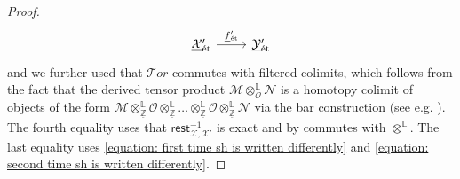\documentclass[11pt]{amsart}
\theoremstyle{definition}
\theoremstyle{definition}
\newtheorem{lemma}[theorem]{Lemma}
\newcommand{\cM}{\mathcal{M}}
\newcommand{\cN}{\mathcal{N}}
\newcommand{\cO}{\mathcal{O}}
\newcommand{\cT}{\mathcal{T}}
\newcommand{\cX}{\mathcal{X}}
\newcommand{\cY}{\mathcal{Y}}
\newcommand{\ul}[1]{\underline{#1}}
\newcommand{\cal}{\mathcal}
\def\cM{{\cal M}}
\def\cN{{\cal N}}
\def\cO{{\cal O}}
\def\cT{{\cal T}}
\def\cX{{\cal X}}
\def\cY{{\cal Y}}
\begin{document}
\begin{proof}
\[\begin{tikzcd}
        \ul{\cX}{}'_{\text{\'et}} \rar["\ul{f}{}'_{\text{\'et}}"] & \ul{\cY}{}'_{\text{\'et}}
    \end{tikzcd}
\]
and we further used that $\cT or$ commutes with filtered colimits, which follows from the fact that the derived tensor product $\cM\otimes^{\mathbb{L}}_{\cO}\cN$ is a homotopy colimit of objects of the form $\cM\otimes^{\mathbb{L}}_{\ul{\mathbb{Z}}}\cO\otimes^{\mathbb{L}}_{\ul{\mathbb{Z}}}\ldots \otimes^{\mathbb{L}}_{\ul{\mathbb{Z}}}\cO\otimes^{\mathbb{L}}_{\ul{\mathbb{Z}}}\cN$ via the bar construction (see e.g. \cite[§3.4.4]{HA}). The fourth equality uses that $\mathsf{rest}_{\cX,\cX'}^{-1}$ is exact and by \cite[07A4]{stacks} commutes with $\otimes^{\mathbb{L}}$. The last equality uses \eqref{equation: first time sh is written differently} and \eqref{equation: second time sh is written differently}.

\end{proof}
\end{document}
